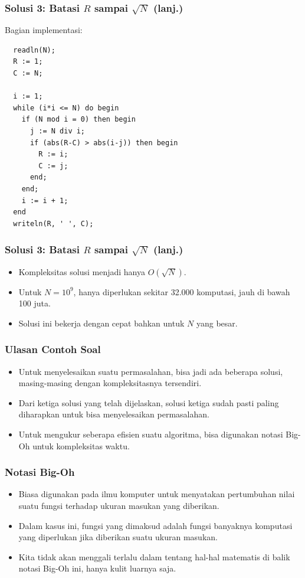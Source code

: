 \begin{frame}[fragile]
\frametitle{Solusi 3: Batasi $R$ sampai $\sqrt{N}$ (lanj.)}
Bagian implementasi:
\begin{lstlisting}
  readln(N);
  R := 1;
  C := N;

  i := 1;
  while (i*i <= N) do begin
    if (N mod i = 0) then begin
      j := N div i;
      if (abs(R-C) > abs(i-j)) then begin
        R := i;
        C := j;
      end;
    end;
    i := i + 1;
  end
  writeln(R, ' ', C);
\end{lstlisting}
\end{frame}

\begin{frame}[fragile]
\frametitle{Solusi 3: Batasi $R$ sampai $\sqrt{N}$ (lanj.)}
\begin{itemize}
  \item Kompleksitas solusi menjadi hanya $O(\sqrt{N})$.
  \item Untuk $N = 10^9$, hanya diperlukan sekitar 32.000 komputasi, jauh di bawah 100 juta.
  \item Solusi ini bekerja dengan cepat bahkan untuk $N$ yang besar.
\end{itemize}
\end{frame}

\begin{frame}
\frametitle{Ulasan Contoh Soal}
\begin{itemize}
  \item Untuk menyelesaikan suatu permasalahan, bisa jadi ada beberapa solusi, masing-masing dengan kompleksitasnya tersendiri.
  \item Dari ketiga solusi yang telah dijelaskan, solusi ketiga sudah pasti paling diharapkan untuk bisa menyelesaikan permasalahan.
  \item Untuk mengukur seberapa efisien suatu algoritma, bisa digunakan notasi Big-Oh untuk kompleksitas waktu.
\end{itemize}
\end{frame}

\begin{frame}
\frametitle{Notasi Big-Oh}
\begin{itemize}
  \item Biasa digunakan pada ilmu komputer untuk menyatakan pertumbuhan nilai suatu fungsi terhadap ukuran masukan yang diberikan.
  \item Dalam kasus ini, fungsi yang dimaksud adalah fungsi banyaknya komputasi yang diperlukan jika diberikan suatu ukuran masukan.
  \item Kita tidak akan menggali terlalu dalam tentang hal-hal matematis di balik notasi Big-Oh ini, hanya kulit luarnya saja.
\end{itemize}
\end{frame}

